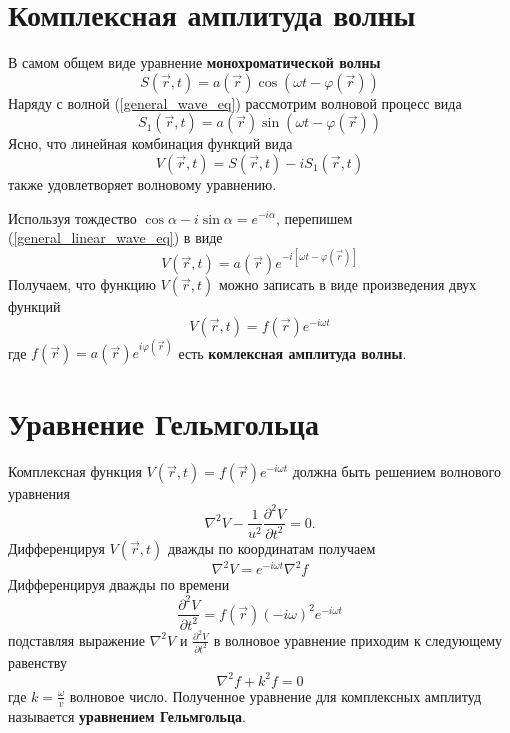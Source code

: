 \documentclass[a4paper, 12pt]{book}
\begin{document}
	\section{Комплексная амплитуда волны}
	В самом общем виде уравнение \textbf{монохроматической волны}
	\begin{equation}
		S\left(\vec{r},t\right)=a\left(\vec{r}\right)\cos\left(\omega t-\varphi\left(\vec{r}\right)\right)
		\label{general_wave_eq}
	\end{equation}
	Наряду с волной (\ref{general_wave_eq}) рассмотрим волновой процесс вида
	\begin{equation*}
		S_1\left(\vec{r},t\right)=a\left(\vec{r}\right)\sin\left(\omega t-\varphi\left(\vec{r}\right)\right)
	\end{equation*}
	Ясно, что линейная комбинация функций вида
	\begin{equation}
		V\left(\vec{r},t\right)=S\left(\vec{r},t\right)-iS_1\left(\vec{r},t\right)
		\label{general_linear_wave_eq}
	\end{equation}
	также удовлетворяет волновому уравнению.\par
	Используя тождество $\cos\alpha-i\sin\alpha=e^{-i\alpha}$, перепишем (\ref{general_linear_wave_eq}) в виде
	\begin{equation*}
		V\left(\vec{r},t\right)=a\left(\vec{r}\right)e^{-i\left[\omega t-\varphi\left(\vec{r}\right)\right]}
	\end{equation*}
	Получаем, что функцию $V\left(\vec{r},t\right)$ можно записать в виде произведения двух функций
	\begin{equation*}
		V\left(\vec{r},t\right)=f\left(\vec{r}\right)e^{-i\omega t}
	\end{equation*}
	где $f\left(\vec{r}\right)=a\left(\vec{r}\right)e^{i\varphi\left(\vec{r}\right)}$ есть \textbf{комлексная амплитуда волны}.
	\section{Уравнение Гельмгольца}
	Комплексная функция $V\left(\vec{r},t\right)=f\left(\vec{r}\right)e^{-i\omega t}$ должна быть решением волнового уравнения
	\begin{equation*}
		\nabla^2 V-\frac{1}{u^2}\frac{\partial^2 V}{\partial t^2}=0.
	\end{equation*}
	Дифференцируя $V\left(\vec{r},t\right)$ дважды по координатам получаем
	\begin{equation*}
		\nabla^2 V=e^{-i\omega t}\nabla^2 f
	\end{equation*}
	Дифференцируя дважды по времени
	\begin{equation*}
		\frac{\partial^2 V}{\partial t^2}=f\left(\vec{r}\right)\left(-i\omega\right)^2e^{-i\omega t}
	\end{equation*}
	подставляя выражение $\nabla^2 V$ и $\frac{\partial^2 V}{\partial t^2}$ в волновое уравнение приходим к следующему равенству
	\begin{equation}
		\nabla^2 f+k^2 f=0
	\end{equation}
	где $k=\frac{\omega}{v}$ волновое число. Полученное уравнение для комплексных амплитуд называется \textbf{уравнением Гельмгольца}.
\end{document}
